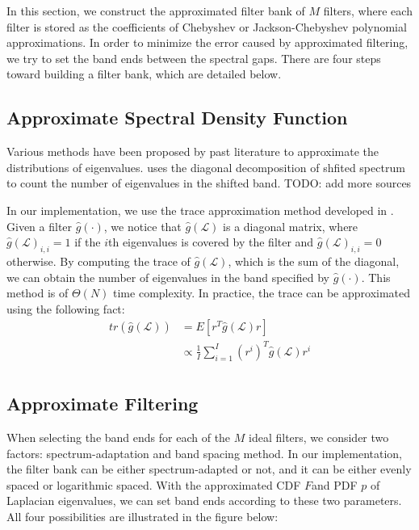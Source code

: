 \documentclass[a4paper]{article}
\newcommand{\La}{\mathcal{L}}
\theoremstyle{definition}
\begin{document}
In this section, we construct the approximated filter bank of $M$ filters, where each filter is stored as the coefficients of Chebyshev or Jackson-Chebyshev polynomial approximations. In order to minimize the error caused by approximated filtering, we try to set the band ends between the spectral gaps. There are four steps toward building a filter bank, which are detailed below.

\subsection{Approximate Spectral Density Function}

Various methods have been proposed by past literature to approximate the distributions of eigenvalues. \cite{hammond2011wavelets,shuman_DCOSS_2011} uses the diagonal decomposition of shfited spectrum to count the number of eigenvalues in the shifted band. {\color{red}TODO: add more sources}

In our implementation,  we use the trace approximation method developed in \cite{approximating spectral densities of large matrices}. Given a filter $\hat{g}(\cdot)$, we notice that $\hat{g}(\La)$ is a diagonal matrix, where $\hat{g}(\La)_{i,i} = 1$ if the $i$th eigenvalues is covered by the filter and $\hat{g}(\La)_{i,i} = 0$ otherwise. By computing the trace of $\hat{g}(\La)$, which is the sum of the diagonal, we can obtain the number of eigenvalues in the band specified by $\hat{g}(\cdot)$. This method is of $\Theta(N)$ time complexity.
In practice, the trace can be approximated using the following fact:
\begin{align*}
tr(\hat{g}(\La)) &= E[r^T\hat{g}(\La)r] \\
&\propto \frac{1}{I}\sum_{i =1}^{I} (r^{i})^T\hat{g}(\La)r^{i}\\
\end{align*}


\subsection{Approximate Filtering}

When selecting the band ends for each of the $M$ ideal filters, we consider two factors: spectrum-adaptation and band spacing method. In our implementation, the filter bank can be either spectrum-adapted or not, and it can be either evenly spaced or logarithmic spaced. With the approximated CDF $F$and PDF $p$ of Laplacian eigenvalues, we can set band ends according to these two parameters. All four possibilities are illustrated in the figure below:
\end{document}
